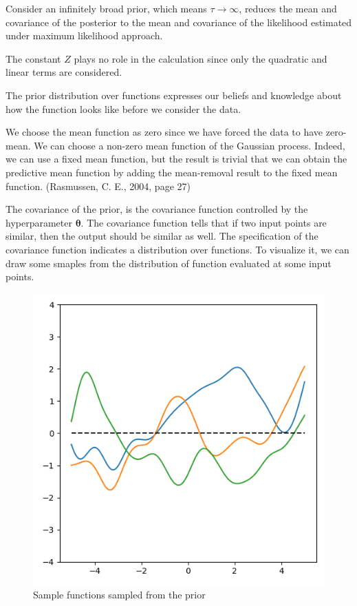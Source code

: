 \documentclass[12pt]{article}
\newenvironment{question}[2][Question]{\begin{trivlist}
\kern10pt
\item[\hskip \labelsep {\bfseries #1}\hskip \labelsep {\bfseries #2.}]}{\end{trivlist}}
\begin{document}
\begin{question}{5}
Consider an infinitely broad prior, which means $\tau \to \infty$, reduces the 
mean and covariance of the posterior to the mean and covariance of the likelihood
estimated under maximum likelihood approach. \par

The constant $Z$ plays no role in the calculation since only the quadratic and linear
 terms are considered.

\end{question}

\begin{question}{6}
  The prior distribution over functions expresses our beliefs and knowledge about
how the function looks like before we consider the data.

We choose the mean function as zero
since we have forced the data to have zero-mean. We can choose a non-zero mean
function of the Gaussian process. Indeed, we can use a fixed mean function, but
the result is trivial that we can obtain the predictive mean function by adding 
the mean-removal result to the fixed mean function.
(Rasmussen, C. E., 2004, page 27)

The covariance of the prior, is the covariance
function controlled by the hyperparameter $\bm{\theta}$. The covariance function
tells that if two input points are similar, then the output should be similar as
well. The specification of the covariance function indicates a distribution over 
functions. To visualize it, we can draw some smaples from the distribution of 
function evaluated at some input points.

\begin{figure}[h!]
  \centering
  \includegraphics[width=0.5\linewidth]{fig/Q6-prior.png}
  \caption{Sample functions sampled from the prior}
\end{figure}
\end{question}
\end{document}
